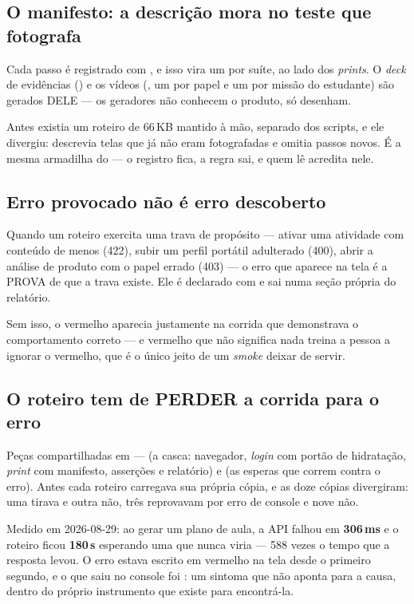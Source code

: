 \subsection{O manifesto: a descrição mora no teste que fotografa}

Cada passo é registrado com , e isso vira um  por suíte, ao lado dos
\emph{prints}. O \emph{deck} de evidências () e os vídeos
(, um por papel e um por missão do estudante) são gerados DELE ---
os geradores não conhecem o produto, só desenham.

Antes existia um roteiro de 66\,KB mantido à mão, separado dos scripts, e ele
divergiu: descrevia telas que já não eram fotografadas e omitia passos novos. É
a mesma armadilha do  --- o registro fica, a regra sai, e quem lê
acredita nele.

\subsection{Erro provocado não é erro descoberto}

Quando um roteiro exercita uma trava de propósito --- ativar uma atividade com
conteúdo de menos (422), subir um perfil portátil adulterado (400), abrir a
análise de produto com o papel errado (403) --- o erro que aparece na tela é a
PROVA de que a trava existe. Ele é declarado com  e sai numa seção própria do relatório.

Sem isso, o vermelho aparecia justamente na corrida que demonstrava o
comportamento correto --- e vermelho que não significa nada treina a pessoa a
ignorar o vermelho, que é o único jeito de um \emph{smoke} deixar de servir.

\subsection{O roteiro tem de PERDER a corrida para o erro}

Peças compartilhadas em  ---  (a casca:
navegador, \emph{login} com portão de hidratação, \emph{print} com manifesto,
asserções e relatório) e  (as esperas que correm contra o erro).
Antes cada roteiro carregava sua própria cópia, e as doze cópias divergiram:
uma tirava  e outra não, três reprovavam por erro de console e nove
não.

Medido em 2026-08-29: ao gerar um plano de aula, a API falhou em
\textbf{306\,ms} e o roteiro ficou \textbf{180\,s} esperando uma 
que nunca viria --- 588 vezes o tempo que a resposta levou. O erro estava
escrito em vermelho na tela desde o primeiro segundo, e o que saiu no console
foi : um sintoma que não aponta para a
causa, dentro do próprio instrumento que existe para encontrá-la.

